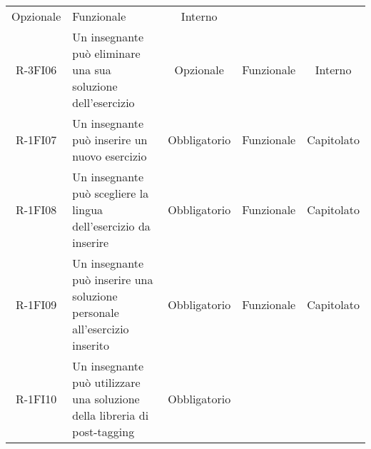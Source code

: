 \begin{tabularx}{\textwidth}{cXccc}
Opzionale &

Funzionale &

Interno \\
R-3FI06 &

Un insegnante può eliminare una sua soluzione  dell’esercizio &

Opzionale &

Funzionale &

Interno \\
R-1FI07 &

Un insegnante può inserire un nuovo esercizio &

Obbligatorio &

Funzionale &

Capitolato \\
R-1FI08 &

Un insegnante può scegliere la lingua dell’esercizio da inserire &

Obbligatorio &

Funzionale &

Capitolato \\
R-1FI09 &

Un insegnante può inserire una soluzione personale all’esercizio inserito &

Obbligatorio &

Funzionale &

Capitolato \\
R-1FI10 &

Un insegnante può utilizzare una soluzione della libreria di post-tagging &

Obbligatorio &


\end{tabularx}
